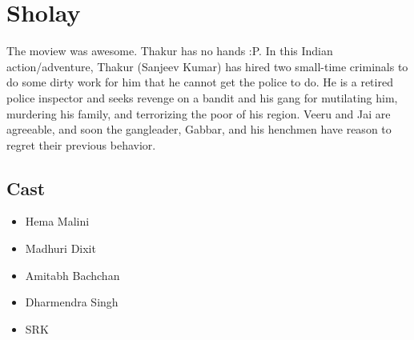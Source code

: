 \documentclass{article}
\begin{document}
\section{Sholay}
The moview was awesome. Thakur has no hands :P. In this Indian action/adventure, Thakur (Sanjeev Kumar) has hired two small-time criminals to do some dirty work for him that he cannot get the police to do. He is a retired police inspector and seeks revenge on a bandit and his gang for mutilating him, murdering his family, and terrorizing the poor of his region. Veeru and Jai are agreeable, and soon the gangleader, Gabbar, and his henchmen have reason to regret their previous behavior.
\subsection{Cast}
\begin{itemize}
\item Hema Malini
\item Madhuri Dixit
\item Amitabh Bachchan
\item Dharmendra Singh
\item SRK
  \end{itemize}
\end{document}
